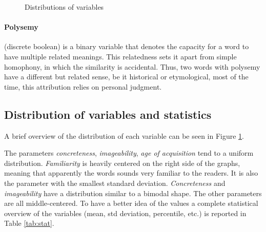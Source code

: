 \documentclass[a4paper,11pt,dvipsnames]{article}
\begin{document}
\begin{figure}[ht]
\caption{Distributions of variables}\label{fig:dis}

\end{figure}

\paragraph{Polysemy} (discrete boolean) is a binary variable that denotes the capacity for a word to have multiple related meanings. This relatedness sets it apart from simple homophony, in which the similarity is accidental. Thus, two words with polysemy have a different but related sense, be it historical or etymological, most of the time, this attribution relies on personal judgment.



\subsection[Distributions and statistics]{Distribution of variables and statistics}


A brief overview of the distribution of each variable can be seen in Figure \ref{fig:dis}. 



The parameters \textit{concreteness}, \textit{imageability}, \textit{age of acquisition} tend to a uniform distribution. \textit{Familiarity} is heavily centered on the right side of the graphs, meaning that apparently the words sounds very familiar to the readers. It is also the parameter with the smallest standard deviation. \textit{Concreteness} and \textit{imageability} have a distribution similar to a bimodal shape. The other parameters are all middle-centered. To have a better idea of the values a complete statistical overview of the variables (mean, std deviation, percentile, etc.) is reported in Table \ref{tab:stat}. 
\end{document}
